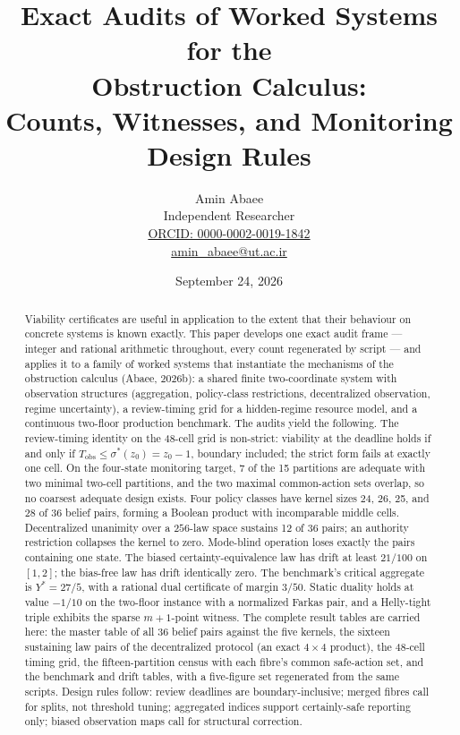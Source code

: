 \documentclass[10pt,twocolumn]{article}
\theoremstyle{definition}
\begin{document}
\title{Exact Audits of Worked Systems for the\\
Obstruction Calculus:\\
Counts, Witnesses, and Monitoring Design Rules}
\author{Amin Abaee\\[0.35em]
{\small Independent Researcher}\\[0.55em]
{\small\href{https://orcid.org/0000-0002-0019-1842}{ORCID: 0000-0002-0019-1842}}\\[0.3em]
{\small\href{mailto:amin\_abaee@ut.ac.ir}{amin\_abaee@ut.ac.ir}}}
\date{September 24, 2026}
\maketitle

\begin{abstract}
Viability certificates are useful in application to the extent that their
behaviour on concrete systems is known exactly. This paper develops one
exact audit frame --- integer and rational arithmetic throughout, every
count regenerated by script --- and applies it to a family of worked
systems that instantiate the mechanisms of the obstruction calculus
(Abaee, 2026b): a shared finite two-coordinate system with observation
structures (aggregation, policy-class restrictions, decentralized
observation, regime uncertainty), a review-timing grid for a
hidden-regime resource model, and a continuous two-floor production
benchmark. The audits yield the following. The review-timing identity on
the 48-cell grid is non-strict: viability at the deadline holds if and
only if \(T_{\mathrm{obs}} \le \sigma^{*}(z_0) = z_0 - 1\), boundary
included; the strict form fails at exactly one cell. On the four-state
monitoring target, 7 of the 15 partitions are adequate with two minimal
two-cell partitions, and the two maximal common-action sets overlap, so
no coarsest adequate design exists. Four policy classes have kernel
sizes 24, 26, 25, and 28 of 36 belief pairs, forming a Boolean product
with incomparable middle cells. Decentralized unanimity over a
\(256\)-law space sustains 12 of 36 pairs; an authority restriction
collapses the kernel to zero. Mode-blind operation loses exactly the
pairs containing one state. The biased certainty-equivalence law has
drift at least \(21/100\) on \([1,2]\); the bias-free law has drift
identically zero. The benchmark's critical aggregate is \(Y^{*} = 27/5\),
with a rational dual certificate of margin \(3/50\). Static duality
holds at value \(-1/10\) on the two-floor instance with a normalized
Farkas pair, and a Helly-tight triple exhibits the sparse \(m{+}1\)-point
witness. The complete result tables are carried here: the master table
of all 36 belief pairs against the five kernels, the sixteen sustaining
law pairs of the decentralized protocol (an exact \(4 \times 4\)
product), the 48-cell timing grid, the fifteen-partition census with
each fibre's common safe-action set, and the benchmark and drift tables,
with a five-figure set regenerated from the same scripts. Design rules
follow: review deadlines are boundary-inclusive; merged fibres call for
splits, not threshold tuning; aggregated indices support certainly-safe
reporting only; biased observation maps call for structural correction.
\end{abstract}
\end{document}
